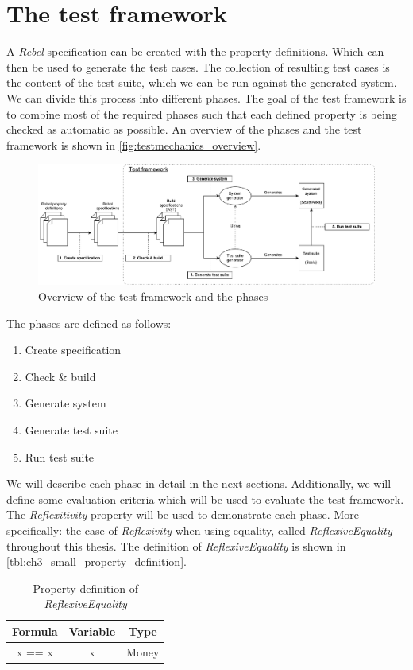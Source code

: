 \section{The test framework}
A \textit{Rebel} specification can be created with the property definitions.
Which can then be used to generate the test cases. The collection of resulting
test cases is the content of the test suite, which we can be run against the
generated system. We can divide this process into different phases. The goal of
the test framework is to combine most of the required phases such that each
defined property is being checked as automatic as possible. An overview of the
phases and the test framework is shown in \autoref{fig:testmechanics_overview}.
\begin{figure}[!ht]
	\includegraphics[width=\linewidth]{figures/testmechanics_overview}
\caption{Overview of the test framework and the phases}
\label{fig:testmechanics_overview}
\centering
\end{figure}
\FloatBarrier
The phases are defined as follows:
\def \tfPhaseOne{Create specification}
\def \tfPhaseTwo{Check \& build}
\def \tfPhaseThree{Generate system}
\def \tfPhaseFour{Generate test suite}
\def \tfPhaseFive{Run test suite}
\begin{enumerate}
  \item \tfPhaseOne{}
  \item \tfPhaseTwo{}
  \item \tfPhaseThree{}
  \item \tfPhaseFour{}
  \item \tfPhaseFive{}
\end{enumerate}
We will describe each phase in detail in the next sections. Additionally, we
will define some evaluation criteria which will be used to evaluate the test
framework. The \textit{Reflexitivity} property will be used to demonstrate each
phase. More specifically: the case of \textit{Reflexivity} when using equality,
called \textit{ReflexiveEquality} throughout this thesis. The definition of
\textit{ReflexiveEquality} is shown in
\autoref{tbl:ch3_small_property_definition}.
\begin{table}[!ht]
\centering
\begin{tabular}{ccc}
\hline
\textbf{Formula} & \textbf{Variable} & \textbf{Type} \\ \hline
x == x & x & Money \\ \hline
\end{tabular}
\caption{Property definition of \textit{ReflexiveEquality}}
\label{tbl:ch3_small_property_definition}
\end{table}
\FloatBarrier

